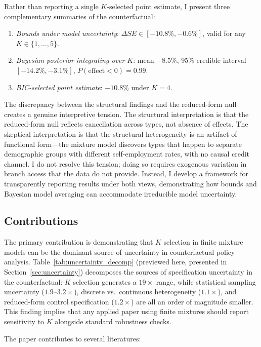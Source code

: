 \documentclass[12pt]{article}
\begin{document}
Rather than reporting a single $K$-selected point estimate, I present three complementary summaries of the counterfactual:
\begin{enumerate}
    \item \textit{Bounds under model uncertainty}: $\Delta SE \in [-10.8\%, -0.6\%]$, valid for any $K \in \{1, \ldots, 5\}$.
    \item \textit{Bayesian posterior integrating over $K$}: mean $-8.5\%$, 95\% credible interval $[-14.2\%, -3.1\%]$, $P(\text{effect} < 0) = 0.99$.
    \item \textit{BIC-selected point estimate}: $-10.8\%$ under $K=4$.
\end{enumerate}

The discrepancy between the structural findings and the reduced-form null creates a genuine interpretive tension. The structural interpretation is that the reduced-form null reflects cancellation across types, not absence of effects. The skeptical interpretation is that the structural heterogeneity is an artifact of functional form---the mixture model discovers types that happen to separate demographic groups with different self-employment rates, with no causal credit channel. I do not resolve this tension; doing so requires exogenous variation in branch access that the data do not provide. Instead, I develop a framework for transparently reporting results under both views, demonstrating how bounds and Bayesian model averaging can accommodate irreducible model uncertainty.

\subsection{Contributions}

The primary contribution is demonstrating that $K$ selection in finite mixture models can be the dominant source of uncertainty in counterfactual policy analysis. Table~\ref{tab:uncertainty_decomp} (previewed here, presented in Section~\ref{sec:uncertainty}) decomposes the sources of specification uncertainty in the counterfactual: $K$ selection generates a $19\times$ range, while statistical sampling uncertainty ($1.9$--$3.2\times$), discrete vs.\ continuous heterogeneity ($1.1\times$), and reduced-form control specification ($1.2\times$) are all an order of magnitude smaller. This finding implies that any applied paper using finite mixtures should report sensitivity to $K$ alongside standard robustness checks.

The paper contributes to several literatures:
\end{document}
